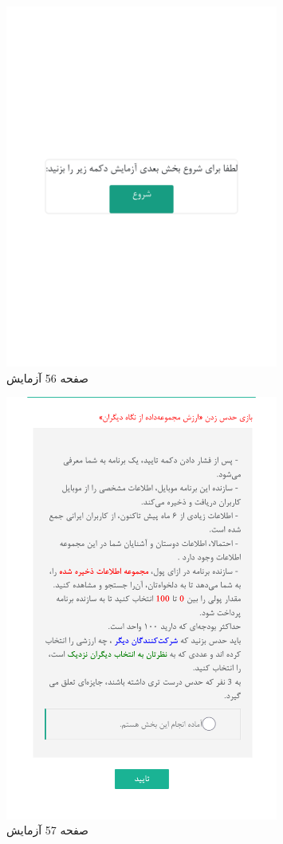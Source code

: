 { 
\begin{figure}[htpb]
\centering
\includegraphics[width=0.8\textwidth]{./img/Task56.png/}
\caption{ صفحه 56 آزمایش }
\label{fig:Task56}
\end{figure}
 
 
\begin{figure}[htpb]
\centering
\includegraphics[width=0.8\textwidth]{./img/Task57.png/}
\caption{ صفحه 57 آزمایش }
\label{fig:Task57}
\end{figure}
 
}
